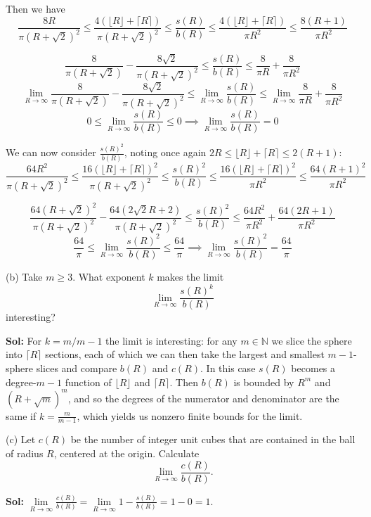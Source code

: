 \documentclass{amsart}
\begin{document}
Then we have $$\frac{8R}{\pi(R+\sqrt{2})^2}\leq\frac{4(\lfloor R\rfloor +\lceil R\rceil)}{\pi (R+\sqrt{2})^2} \leq\frac{s(R)}{b(R)}\leq \frac{4(\lfloor R\rfloor +\lceil R\rceil)}{\pi R^2}\leq\frac{8(R+1)}{\pi R^2}$$

$$\frac{8}{\pi(R+\sqrt{2})}-\frac{8\sqrt{2}}{\pi(R+\sqrt{2})^2}\leq \frac{s(R)}{b(R)}\leq \frac{8}{\pi R}+ \frac{8}{\pi R^2}$$
$$\lim_{R\rightarrow\infty}\frac{8}{\pi(R+\sqrt{2})}-\frac{8\sqrt{2}}{\pi(R+\sqrt{2})^2}\leq \lim_{R\rightarrow\infty}\frac{s(R)}{b(R)}\leq \lim_{R\rightarrow\infty}\frac{8}{\pi R}+ \frac{8}{\pi R^2}$$
$$0\leq\lim_{R\rightarrow\infty}\frac{s(R)}{b(R)}\leq 0\implies \lim_{R\rightarrow\infty}\frac{s(R)}{b(R)}=0$$

We can now consider $\frac{s(R)^2}{b(R)}$, noting once again $2R\leq\lfloor R\rfloor+\lceil R\rceil\leq 2(R+1)$:
$$\frac{64R^2}{\pi(R+\sqrt{2})^2}\leq\frac{16(\lfloor R\rfloor +\lceil R\rceil)^2}{\pi (R+\sqrt{2})^2} \leq\frac{s(R)^2}{b(R)}\leq \frac{16(\lfloor R\rfloor +\lceil R\rceil)^2}{\pi R^2}\leq\frac{64(R+1)^2}{\pi R^2}$$

$$\frac{64(R+\sqrt{2})^2}{\pi(R+\sqrt{2})^2}-\frac{64(2\sqrt{2}R+2)}{\pi(R+\sqrt{2})^2}\leq\frac{s(R)^2}{b(R)}\leq\frac{64R^2}{\pi R^2}+\frac{64(2R+1)}{\pi R^2}$$
$$\frac{64}{\pi}\leq\lim_{R\rightarrow\infty}\frac{s(R)^2}{b(R)}\leq\frac{64}{\pi}\implies\lim_{R\rightarrow\infty}\frac{s(R)^2}{b(R)}=\frac{64}{\pi}$$

\bigskip

\indent (b) Take $m\geq 3$. What exponent $k$ makes the limit $$\lim_{R\rightarrow\infty}\frac{s(R)^k}{b(R)}$$ interesting?

\medskip
\noindent \textbf{Sol:} For $k=m/m-1$ the limit is interesting: for any $m\in\mathbb{N}$ we slice the sphere into $\lceil R\rceil$ sections, each of which we can
then take the largest and smallest $m-1$-sphere slices and compare $b(R)$ and $c(R)$. In this case $s(R)$ becomes a degree-$m-1$ function of $\lfloor R\rfloor$ and 
$\lceil R\rceil$. Then $b(R)$ is bounded by $R^m$ and $(R+\sqrt{m})^m$, and so the degrees of the numerator and denominator are the same if $k=\frac{m}{m-1}$, which
yields us nonzero finite bounds for the limit.

\bigskip

\indent (c) Let $c(R)$ be the number of integer unit cubes that are contained in the ball of radius $R$, centered at the origin.
Calculate $$\lim_{R\rightarrow\infty} \frac{c(R)}{b(R)}.$$

\medskip
\noindent \textbf{Sol:} $\lim\limits_{R\rightarrow\infty} \frac{c(R)}{b(R)}=\lim\limits_{R\rightarrow\infty} 1-\frac{s(R)}{b(R)}=1-0=1$. 
\end{document}
